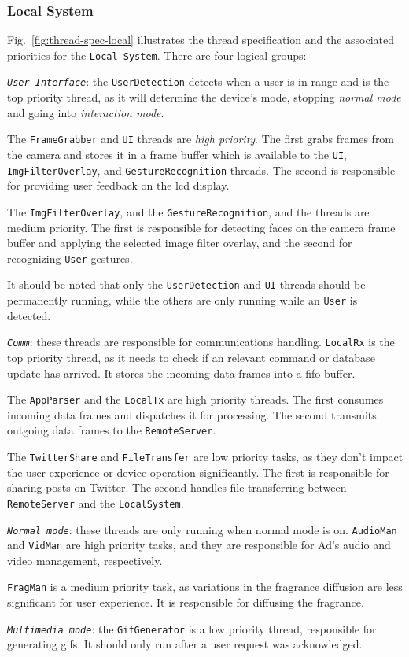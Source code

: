\subsubsection{Local System}
\label{sec:local-system-2}
%
Fig.~\ref{fig:thread-spec-local} illustrates the thread specification and the
associated priorities for the \texttt{Local System}. There are four logical
groups:
\begin{enum-c}
\item
  \emph{\texttt{User Interface}}: the \texttt{UserDetection} detects when a user
  is in range and is the top priority
  thread, as it will determine the device's mode, stopping \emph{normal mode}
  and going into \emph{interaction mode}.

  The \texttt{FrameGrabber} and \texttt{UI} threads are \emph{high
    priority}. The first grabs frames from the camera and stores it in a frame
  buffer which is available to the \texttt{UI}, \texttt{ImgFilterOverlay}, and
  \texttt{GestureRecognition} threads. The second is
  responsible for providing user feedback on the \gls{lcd} display.

  The \texttt{ImgFilterOverlay}, and the \texttt{GestureRecognition}, and the
  threads are medium priority. The first is responsible
  for detecting faces on the camera frame buffer and applying the selected image
  filter overlay, and the second for recognizing \texttt{User} gestures.

  It should be noted that only the \texttt{UserDetection} and \texttt{UI}
  threads should be permanently running, while the others are only running while
  an \texttt{User} is detected.
\item
  \emph{\texttt{Comm}}: these threads are responsible for communications
  handling.
  \texttt{LocalRx} is the top priority thread, as it needs to check if an
  relevant command or database update has arrived. It stores the incoming data
  frames into a \gls{fifo} buffer.

  The \texttt{AppParser} and the \texttt{LocalTx} are high priority threads. The
  first consumes incoming data frames and dispatches it for processing. The
  second transmits outgoing data frames to the \texttt{RemoteServer}.

  The \texttt{TwitterShare} and \texttt{FileTransfer} are low priority tasks, as
  they don't impact the user experience or device operation significantly. The
  first is responsible for sharing posts on Twitter. The second handles file
  transferring between \texttt{RemoteServer} and the \texttt{LocalSystem}.
\item
  \emph{\texttt{Normal mode}}: these threads are only running when normal mode
  is on.
  \texttt{AudioMan} and \texttt{VidMan} are high priority tasks, and they are
  responsible for Ad's audio and video management, respectively.

  \texttt{FragMan} is a medium priority task, as variations in the fragrance
  diffusion are less significant for user experience. It is responsible for
  diffusing the fragrance.
\item
  \emph{\texttt{Multimedia mode}}: the \texttt{GifGenerator} is a low priority
  thread, responsible for generating \glspl{gif}. It should only run after a
  user request was acknowledged.
\end{enum-c}
